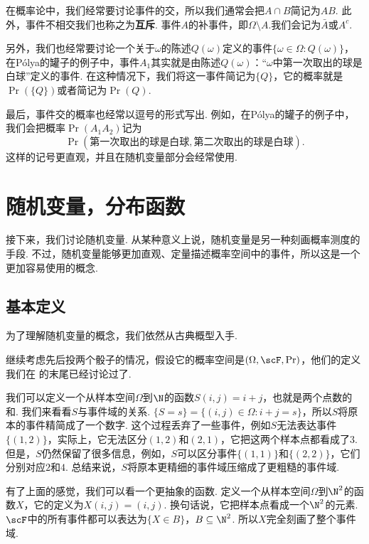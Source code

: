 \begin{remark}
    在概率论中，我们经常要讨论事件的交，所以我们通常会把$A\cap B$简记为$AB$. 此外，事件不相交我们也称之为\textbf{互斥}. 事件$A$的补事件，即$\Omega\setminus A$.我们会记为$\bar{A}$或$A^c$.
    
    另外，我们也经常要讨论一个关于$\omega$的陈述$Q(\omega)$定义的事件$\{\omega\in\Omega:Q(\omega)\}$，在P\'olya的罐子的例子中，事件$A_1$其实就是由陈述$Q(\omega)$：“$\omega$中第一次取出的球是白球”定义的事件. 在这种情况下，我们将这一事件简记为$\{Q\}$，它的概率就是$\Pr(\{Q\})$或者简记为$\Pr(Q)$. 
    
    最后，事件交的概率也经常以逗号的形式写出. 例如，在P\'olya的罐子的例子中，我们会把概率$\Pr(A_1A_2)$记为
    \[\Pr(\text{第一次取出的球是白球},\text{第二次取出的球是白球}).\] 
    这样的记号更直观，并且在随机变量部分会经常使用. 
\end{remark}

\section{随机变量，分布函数}\label{sec:random-variable}

接下来，我们讨论随机变量. 从某种意义上说，随机变量是另一种刻画概率测度的手段. 不过，随机变量能够更加直观、定量描述概率空间中的事件，所以这是一个更加容易使用的概念. 

\subsection{基本定义}

为了理解随机变量的概念，我们依然从古典概型入手. 

\begin{example}\label{ex:random-variable}
继续考虑先后投两个骰子的情况，假设它的概率空间是$(\Omega,\scF,\Pr)$，他们的定义我们在 的末尾已经讨论过了. 

我们可以定义一个从样本空间$\Omega$到$\N$的函数$S(i,j)=i+j$，也就是两个点数的和. 我们来看看$S$与事件域的关系. $\{S=s\}=\{(i,j)\in\Omega:i+j=s\}$，所以$S$将原本的事件精简成了一个数字. 这个过程丢弃了一些事件，例如$S$无法表达事件$\{(1,2)\}$，实际上，它无法区分$(1,2)$和$(2,1)$，它把这两个样本点都看成了$3$. 但是，$S$仍然保留了很多信息，例如，$S$可以区分事件$\{(1,1)\}$和$\{(2,2)\}$，它们分别对应$2$和$4$. 总结来说，$S$将原本更精细的事件域压缩成了更粗糙的事件域. 

有了上面的感觉，我们可以看一个更抽象的函数. 定义一个从样本空间$\Omega$到$\N^2$的函数$X$，它的定义为$X(i,j) = (i,j)$. 换句话说，它把样本点看成一个$\N^2$的元素. $\scF$中的所有事件都可以表达为$\{X\in B\}$，$B\subseteq\N^2$. 所以$X$完全刻画了整个事件域. 
\end{example}


